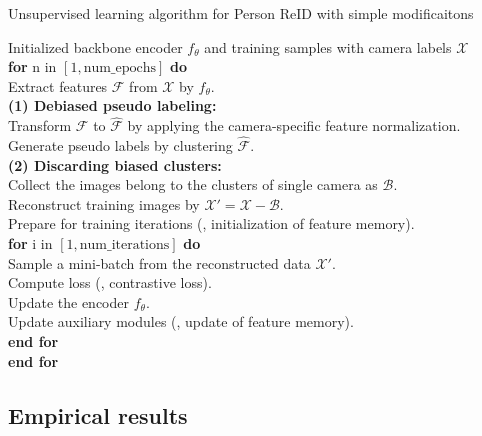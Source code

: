 \begin{algorithm}[t]
\scriptsize
\caption{\small Unsupervised learning algorithm for Person ReID with simple modificaitons} 
\label{alg:strategies}
\begin{algorithmic}
\REQUIRE Initialized backbone encoder $f_\theta$ and training samples with camera labels $\mathcal{X}$ \\
\textbf{for} n in $[1, \text{num\_epochs}]$ \textbf{do}\\
\quad Extract features $\mathcal{F}$ from $\mathcal{X}$ by $f_\theta$.  \\
\quad \textbf{(1) Debiased pseudo labeling:}\\
\quad \quad Transform $\mathcal{F}$ to $\hat{\mathcal{F}}$ by applying the camera-specific feature normalization.  \\
\quad \quad Generate pseudo labels by clustering $\hat{\mathcal{F}}$.  \\
\quad \textbf{(2) Discarding biased clusters:}\\
\quad \quad Collect the images belong to the clusters of single camera as $\mathcal{B}$.  \\
\quad \quad Reconstruct training images by $\mathcal{X'} = \mathcal{X} - \mathcal{B}$.   \\
\quad Prepare for training iterations (\eg, initialization of feature memory).  \\
\quad \textbf{for} i in $[1, \text{num\_iterations}]$ \textbf{do}\\
\quad \quad Sample a mini-batch from the reconstructed data $\mathcal{X'}$. \\
\quad \quad Compute loss (\eg, contrastive loss). \\
\quad \quad Update the encoder $f_\theta$. \\
\quad \quad Update auxiliary modules (\eg, update of feature memory). \\
\quad \textbf{end for}\\
\textbf{end for}
\end{algorithmic}
\end{algorithm}


\subsection{Empirical results}
\label{subsec:strategy_usl_result}

